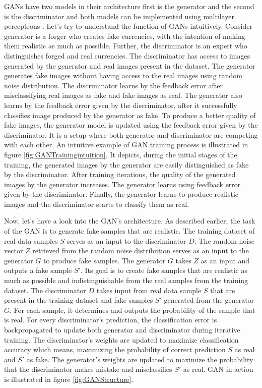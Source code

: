 \acp{GAN} have two models in their architecture first is the generator and the second is the discriminator and both models can be implemented using multilayer perceptrons \cite{goodfellow2014generative}. Let's try to understand the function of \acp{GAN} intuitively. Consider generator is a forger who creates fake currencies, with the intention of making them realistic as much as possible. Further, the discriminator is an expert who distinguishes forged and real currencies. The discriminator has access to images generated by the generator and real images present in the dataset. The generator generates fake images without having access to the real images using random noise distribution. The discriminator learns by the feedback error after misclassifying real images as fake and fake images as real. The generator also learns by the feedback error given by the discriminator, after it successfully classifies image produced by the generator as fake. To produce a better quality of fake images, the generator model is updated using the feedback error given by the discriminator. It is a setup where both generator and discriminator are competing with each other. An intuitive example of \ac{GAN} training process is illustrated in figure \ref{fig:GANTrainingintuition}. It depicts, during the initial stages of the training, the generated images by the generator are easily distinguished as fake by the discriminator. After training iterations, the quality of the generated images by the generator increases. The generator learns using feedback error given by the discriminator. Finally, the generator learns to produce realistic images and the discriminator starts to classify them as real.

Now, let's have a look into the \ac{GAN}'s architecture. As described earlier, the task of the \ac{GAN} is to generate fake samples that are realistic. The training dataset of real data samples $S$ serves as an input to the discriminator $D$. The random noise vector $Z$ retrieved from the random noise distribution serves as an input to the generator $G$ to produce fake samples. The generator $G$ takes $Z$ as an input and outputs a fake sample $S'$. Its goal is to create fake samples that are realistic as much as possible and indistinguishable from the real samples from the training dataset. The discriminator $D$ takes input from real data sample $S$ that are present in the training dataset and fake samples $S'$ generated from the generator $G$. For each sample, it determines and outputs the probability of the sample that is real. For every discriminator's prediction, the classification error is backpropagated to update both generator and discriminator during iterative training. The discriminator's weights are updated to maximize classification accuracy which means, maximizing the probability of correct prediction $S$ as real and $S'$ as fake. The generator's weights are updated to maximize the probability that the discriminator makes mistake and misclassifies $S'$ as real. \ac{GAN} in action is illustrated in figure \ref{fig:GANStructure}.


